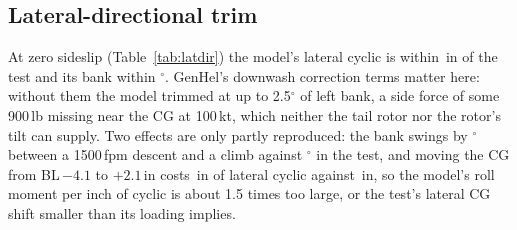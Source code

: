 \documentclass[10pt,a4paper,twocolumn]{article}
\newcommand{\Tab}[1]{}
\begin{document}
\subsection{Lateral-directional trim}
\begin{table}[t]
\centering\small
\caption{Lateral-directional trim against USAAEFA 79-24 sweeps (zero sideslip, from the sweep through it) and ADA180404.
Lateral cyclic in inches from full left, pedal in per cent of travel from full left.}\label{tab:latdir}
\Tab{latdir}
\end{table}

At zero sideslip (Table~\ref{tab:latdir}) the model's lateral cyclic is within \NLlaterr\,in of the test and its bank within
\NLrollerr$^\circ$. GenHel's downwash correction terms matter here: without them the model trimmed at up to 2.5$^\circ$ of left bank,
a side force of some 900\,lb missing near the CG at 100\,kt, which neither the tail rotor nor the rotor's tilt can supply. Two effects
are only partly reproduced: the bank swings by \NLswingmodel$^\circ$ between a 1500\,fpm descent and a climb against \NLswingtest$^\circ$ in
the test, and moving the CG from BL\,$-4.1$ to $+2.1$\,in costs \NLcgmodel\,in of lateral cyclic against \NLcgtest\,in, so the
model's roll moment per inch of cyclic is about 1.5 times too large, or the test's lateral CG shift smaller than its loading implies.
\end{document}
